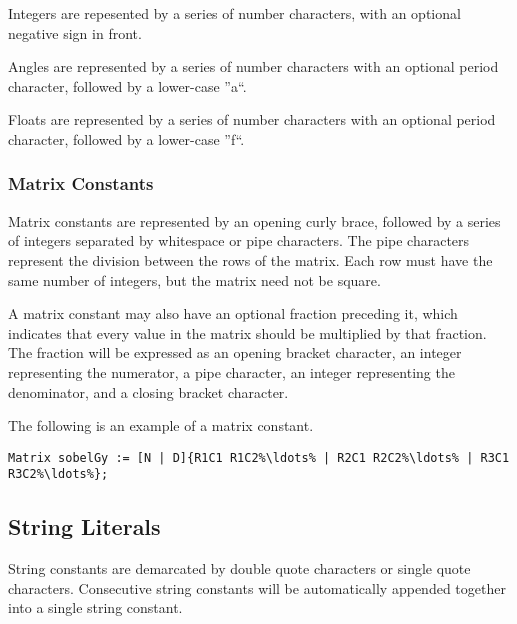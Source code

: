 Integers are repesented by a series of number characters, with an
optional negative sign in front.

Angles are represented by a series of number characters with an
optional period character, followed by a lower-case ''a``.

Floats are represented by a series of number characters with an
optional period character, followed by a lower-case ''f``.

\subsubsection{Matrix Constants}
\label{sssec:matrixconstants}
Matrix constants are represented by an opening curly brace, followed
by a series of integers separated by whitespace or pipe characters.
The pipe characters represent the division between the rows of the
matrix. Each row must have the same number of integers, but the
matrix need not be square.

A matrix constant may also have an optional fraction preceding it,
which indicates that every value in the matrix should be multiplied
by that fraction. The fraction will be expressed as an opening
bracket character, an integer representing the numerator, a pipe
character, an integer representing the denominator, and a closing
bracket character.

The following is an example of a matrix constant.
\begin{lstlisting}[language=CLAM,escapechar=\%]
    Matrix sobelGy := [N | D]{R1C1 R1C2%\ldots% | R2C1 R2C2%\ldots% | R3C1 R3C2%\ldots%};
\end{lstlisting}

\subsection{String Literals}
\label{ssec:strings}

String constants are demarcated by double quote characters or single
quote characters. Consecutive string constants will be automatically
appended together into a single string constant.

